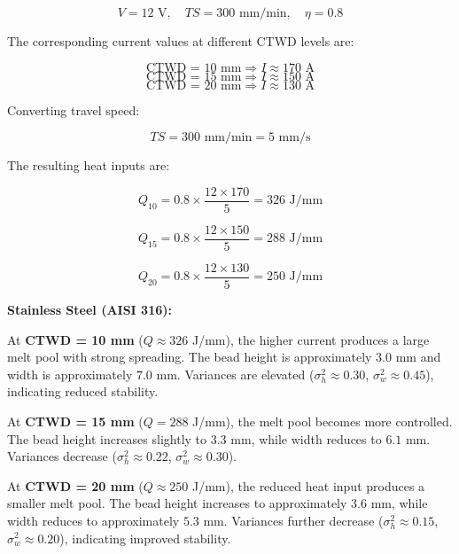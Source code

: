 \documentclass[conference]{IEEEtran}
\begin{document}
\begin{equation}
V = 12 \text{ V}, \quad TS = 300 \text{ mm/min}, \quad \eta = 0.8
\end{equation}

The corresponding current values at different CTWD levels are:

\begin{equation}
\text{CTWD = 10 mm} \Rightarrow I \approx 170 \text{ A}
\end{equation}
\begin{equation}
\text{CTWD = 15 mm} \Rightarrow I \approx 150 \text{ A}
\end{equation}
\begin{equation}
\text{CTWD = 20 mm} \Rightarrow I \approx 130 \text{ A}
\end{equation}

Converting travel speed:

\begin{equation}
TS = 300 \text{ mm/min} = 5 \text{ mm/s}
\end{equation}

The resulting heat inputs are:

\begin{equation}
Q_{10} = 0.8 \times \frac{12 \times 170}{5} = 326 \text{ J/mm}
\end{equation}

\begin{equation}
Q_{15} = 0.8 \times \frac{12 \times 150}{5} = 288 \text{ J/mm}
\end{equation}

\begin{equation}
Q_{20} = 0.8 \times \frac{12 \times 130}{5} = 250 \text{ J/mm}
\end{equation}

\textbf{Stainless Steel (AISI 316):}

At \textbf{CTWD = 10 mm} ($Q \approx 326$ J/mm), the higher current produces a large melt pool with strong spreading. The bead height is approximately $3.0$ mm and width is approximately $7.0$ mm. Variances are elevated ($\sigma_h^2 \approx 0.30$, $\sigma_w^2 \approx 0.45$), indicating reduced stability.

At \textbf{CTWD = 15 mm} ($Q = 288$ J/mm), the melt pool becomes more controlled. The bead height increases slightly to $3.3$ mm, while width reduces to $6.1$ mm. Variances decrease ($\sigma_h^2 \approx 0.22$, $\sigma_w^2 \approx 0.30$).

At \textbf{CTWD = 20 mm} ($Q \approx 250$ J/mm), the reduced heat input produces a smaller melt pool. The bead height increases to approximately $3.6$ mm, while width reduces to approximately $5.3$ mm. Variances further decrease ($\sigma_h^2 \approx 0.15$, $\sigma_w^2 \approx 0.20$), indicating improved stability.
\end{document}
